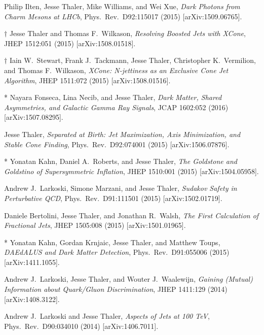\begin{list}{[]\addtocounter{jessecount}{-1}}{\leftmargin=3em \itemsep=4pt}
\item
 Philip Ilten, Jesse Thaler, Mike Williams, and Wei Xue,
\emph{Dark Photons from Charm Mesons at LHCb},
Phys.\ Rev.\ D92:115017 (2015)
[arXiv:1509.06765].

\item
$\dagger$ Jesse Thaler and Thomas F.\ Wilkason,
\emph{Resolving Boosted Jets with XCone},
JHEP 1512:051 (2015)
[arXiv:1508.01518].

\item
$\dagger$ Iain W.\ Stewart, Frank J.\ Tackmann, Jesse Thaler, Christopher K.\ Vermilion, and Thomas F.\ Wilkason,
\emph{XCone: N-jettiness as an Exclusive Cone Jet Algorithm},
JHEP 1511:072 (2015)
[arXiv:1508.01516].

\item
* Nayara Fonseca, Lina Necib, and Jesse Thaler,
\emph{Dark Matter, Shared Asymmetries, and Galactic Gamma Ray Signals},
JCAP 1602:052 (2016)
[arXiv:1507.08295].

\item
 Jesse Thaler,
\emph{Separated at Birth: Jet Maximization, Axis Minimization, and Stable Cone Finding},
Phys.\ Rev.\ D92:074001 (2015)
[arXiv:1506.07876].

\item
* Yonatan Kahn, Daniel A.\ Roberts, and Jesse Thaler,
\emph{The Goldstone and Goldstino of Supersymmetric Inflation},
JHEP 1510:001 (2015)
[arXiv:1504.05958].

\item
 Andrew J.\ Larkoski, Simone Marzani, and Jesse Thaler,
\emph{Sudakov Safety in Perturbative QCD},
Phys.\ Rev.\ D91:111501 (2015)
[arXiv:1502.01719].

\item
 Daniele Bertolini, Jesse Thaler, and Jonathan R.\ Walsh,
\emph{The First Calculation of Fractional Jets},
JHEP 1505:008 (2015)
[arXiv:1501.01965].

\item
* Yonatan Kahn, Gordan Krnjaic, Jesse Thaler, and Matthew Toups,
\emph{DAEdALUS and Dark Matter Detection},
Phys.\ Rev.\ D91:055006 (2015)
[arXiv:1411.1055].

\item
 Andrew J.\ Larkoski, Jesse Thaler, and Wouter J.\ Waalewijn,
\emph{Gaining (Mutual) Information about Quark/Gluon Discrimination},
JHEP 1411:129 (2014)
[arXiv:1408.3122].

\item
 Andrew J.\ Larkoski and Jesse Thaler,
\emph{Aspects of Jets at 100 TeV},
Phys.\ Rev.\ D90:034010 (2014)
[arXiv:1406.7011].


\end{list}
